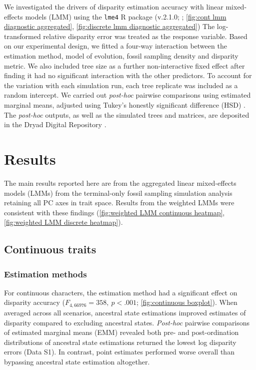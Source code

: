 \documentclass[11pt, a4paper]{article}
\begin{document}
We investigated the drivers of disparity estimation accuracy with linear mixed-effects models (LMM) using the \texttt{lme4} R package (v.2.1.0; \citealp{bates2015fitting}; \autoref{fig:cont lmm diagnostic aggregated}, \ref{fig:discrete lmm diagnostic aggregated})
The log-transformed relative disparity error was treated as the response variable.
Based on our experimental design, we fitted a four-way interaction between the estimation method, model of evolution, fossil sampling density and disparity metric.
We also included tree size as a further non-interactive fixed effect after finding it had no significant interaction with the other predictors.
To account for the variation with each simulation run, each tree replicate was included as a random intercept.
We carried out \textit{post-hoc} pairwise comparisons using estimated marginal means, adjusted using Tukey's honestly significant difference (HSD) \citep{lenth2025emmeans}.
The \textit{post-hoc} outputs, as well as the simulated trees and matrices, are deposited in the Dryad Digital Repository \citep{Scutt2026_dataset}.


\section{Results}
The main results reported here are from the aggregated linear mixed-effects models (LMMs) from the terminal-only fossil sampling simulation analysis retaining all PC axes in trait space.
Results from the weighted LMMs were consistent with these findings (\autoref{fig:weighted LMM continuous heatmap}, \ref{fig:weighted LMM discrete heatmap}).
\subsection{Continuous traits}
\subsubsection{Estimation methods}
For continuous characters, the estimation method had a significant effect on disparity accuracy ($F_{4,66976} = 358, ~ p < .001$; \autoref{fig:continuous boxplot}).
When averaged across all scenarios, ancestral state estimations improved estimates of disparity compared to excluding ancestral states.
\textit{Post-hoc} pairwise comparisons of estimated marginal means (EMM) revealed both pre- and post-ordination distributions of ancestral state estimations returned the lowest log disparity errors (Data S1).
In contrast, point estimates performed worse overall than bypassing ancestral state estimation altogether.
\end{document}

